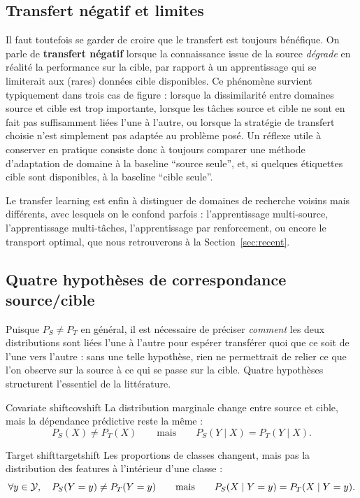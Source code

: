 \documentclass[11pt]{article}
\begin{document}
\subsection{Transfert négatif et limites}

Il faut toutefois se garder de croire que le transfert est toujours bénéfique. On parle de
\textbf{transfert négatif} lorsque la connaissance issue de la source \emph{dégrade} en réalité la
performance sur la cible, par rapport à un apprentissage qui se limiterait aux (rares) données cible
disponibles. Ce phénomène survient typiquement dans trois cas de figure : lorsque la dissimilarité entre
domaines source et cible est trop importante, lorsque les tâches source et cible ne sont en fait pas
suffisamment liées l'une à l'autre, ou lorsque la stratégie de transfert choisie n'est simplement pas
adaptée au problème posé. Un réflexe utile à conserver en pratique consiste donc à toujours comparer une
méthode d'adaptation de domaine à la baseline \enquote{source seule}, et, si quelques étiquettes cible
sont disponibles, à la baseline \enquote{cible seule}.

Le transfer learning est enfin à distinguer de domaines de recherche voisins mais différents, avec
lesquels on le confond parfois : l'apprentissage multi-source, l'apprentissage multi-tâches,
l'apprentissage par renforcement, ou encore le transport optimal, que nous retrouverons à la
Section~\ref{sec:recent}.

\subsection{Quatre hypothèses de correspondance source/cible}
\label{sec:assumptions}

Puisque $P_S\neq P_T$ en général, il est nécessaire de préciser \emph{comment} les deux distributions
sont liées l'une à l'autre pour espérer transférer quoi que ce soit de l'une vers l'autre : sans une telle
hypothèse, rien ne permettrait de relier ce que l'on observe sur la source à ce qui se passe sur la
cible. Quatre hypothèses structurent l'essentiel de la littérature.

\begin{definition}{Covariate shift}{covshift}
La distribution marginale change entre source et cible, mais la dépendance prédictive reste la même :
\[
P_S(X)\neq P_T(X) \qquad\text{mais}\qquad P_S(Y\mid X) = P_T(Y\mid X).
\]
\end{definition}

\begin{definition}{Target shift}{targetshift}
Les proportions de classes changent, mais pas la distribution des features à l'intérieur d'une classe :
\[
\forall y\in\mathcal{Y},\quad P_S(Y=y) \neq P_T(Y=y) \qquad\text{mais}\qquad P_S(X\mid Y=y) = P_T(X\mid Y=y).
\]
\end{definition}
\end{document}
